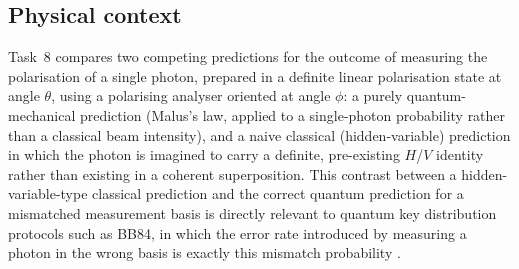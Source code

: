 \documentclass[11pt]{article}
\begin{document}
\subsection{Physical context}
Task~8 compares two competing predictions for the outcome of measuring the polarisation of a single photon, prepared in a definite linear polarisation state at angle $\theta$, using a polarising analyser oriented at angle $\phi$: a purely quantum-mechanical prediction (Malus's law, applied to a single-photon probability rather than a classical beam intensity), and a naive classical (hidden-variable) prediction in which the photon is imagined to carry a definite, pre-existing $H$/$V$ identity rather than existing in a coherent superposition. This contrast between a hidden-variable-type classical prediction and the correct quantum prediction for a mismatched measurement basis is directly relevant to quantum key distribution protocols such as BB84, in which the error rate introduced by measuring a photon in the wrong basis is exactly this mismatch probability \cite{nielsen_chuang}.
\end{document}
